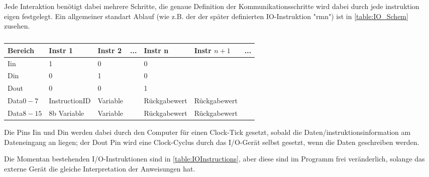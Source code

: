 \documentclass{scrartcl}
\begin{document}
Jede Interaktion benötigt dabei mehrere Schritte, die genaue Definition der Kommunikationsschritte wird dabei durch jede instruktion eigen festgelegt.
Ein allgemeiner standart Ablauf (wie z.B. der der später definierten IO-Instruktion "rmn") ist in \autoref{table:IO_Schem} zusehen.

\begin{center}
	\begin{table}[h]
		\caption{\label{table:IO_Schem}}
		\begin{tabular}{l | l | l | l | l | l | l}
			 Bereich & Instr 1 & Instr 2 & ... & Instr n & Instr $n+1$ & ... \\
			\hline
			Iin & 1 & 0 &   & 0 & \\
			Din & 0 & 1 &   & 0 & \\
			Dout & 0 & 0 &   & 1 & \\
			Data$0-7$ & InstructionID & Variable &   & Rückgabewert & Rückgabewert \\
			Data$8-15$ & 8b Variable & Variable &   & Rückgabewert & Rückgabewert
 		\end{tabular}
	\end{table}
\end{center}

Die Pins Iin und Din werden dabei durch den Computer für einen Clock-Tick gesetzt, sobald die Daten/instruktionsinformation am Dateneingang an liegen; der Dout Pin wird eine Clock-Cyclus durch das I/O-Gerät selbst gesetzt, wenn die Daten geschreiben werden.

Die Momentan bestehenden I/O-Instruktionen sind in \autoref{table:IOInstructions}, aber diese sind im Programm frei veränderlich, solange das externe Gerät die gleiche Interpretation der Anweisungen hat.
\end{document}
